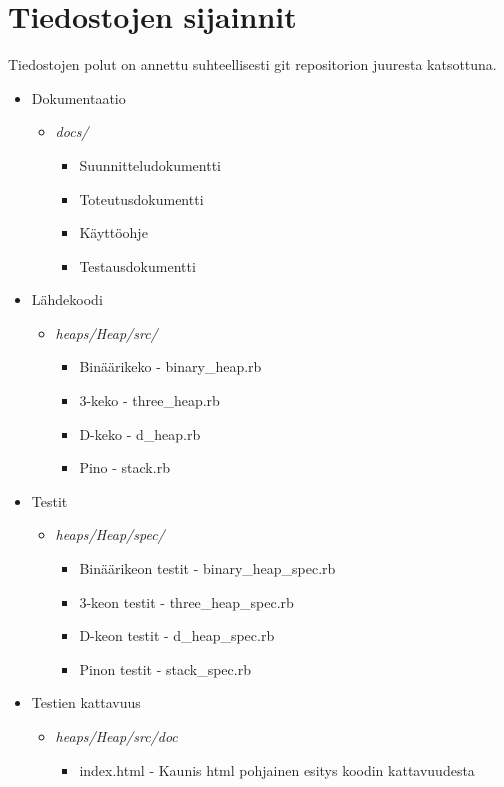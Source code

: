 \documentclass[a4paper,12pt]{article}
\begin{document}
\section{Tiedostojen sijainnit}
Tiedostojen polut on annettu suhteellisesti git repositorion juuresta katsottuna.
\begin{itemize}
\item Dokumentaatio
\begin{itemize}
\item \emph{docs/} 
\begin{itemize}
\item Suunnitteludokumentti
\item Toteutusdokumentti
\item Käyttöohje
\item Testausdokumentti
\end{itemize}
\end{itemize}

\item Lähdekoodi
\begin{itemize}
\item \emph{heaps/Heap/src/} 
\begin{itemize}
\item Binäärikeko - binary\_heap.rb
\item 3-keko - three\_heap.rb
\item D-keko - d\_heap.rb
\item Pino - stack.rb
\end{itemize}
\end{itemize}

\item Testit
\begin{itemize}
\item \emph{heaps/Heap/spec/} 
\begin{itemize}
\item Binäärikeon testit - binary\_heap\_spec.rb
\item 3-keon testit - three\_heap\_spec.rb
\item D-keon testit - d\_heap\_spec.rb
\item Pinon testit - stack\_spec.rb
\end{itemize}
\end{itemize}

\item Testien kattavuus
\begin{itemize}
\item \emph{heaps/Heap/src/doc} 
\begin{itemize}
\item index.html - Kaunis html pohjainen esitys koodin kattavuudesta
\end{itemize}
\end{itemize}

\end{itemize}
\end{document}
